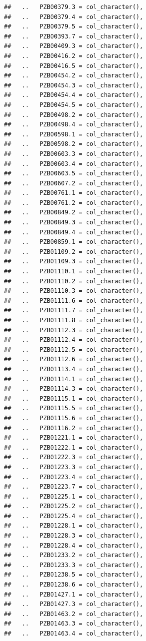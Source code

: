 \documentclass[
]{article}
\begin{document}
\begin{verbatim}
##   ..   PZB00379.3 = col_character(),
##   ..   PZB00379.4 = col_character(),
##   ..   PZB00379.5 = col_character(),
##   ..   PZB00393.7 = col_character(),
##   ..   PZB00409.3 = col_character(),
##   ..   PZB00416.2 = col_character(),
##   ..   PZB00416.5 = col_character(),
##   ..   PZB00454.2 = col_character(),
##   ..   PZB00454.3 = col_character(),
##   ..   PZB00454.4 = col_character(),
##   ..   PZB00454.5 = col_character(),
##   ..   PZB00498.2 = col_character(),
##   ..   PZB00498.4 = col_character(),
##   ..   PZB00598.1 = col_character(),
##   ..   PZB00598.2 = col_character(),
##   ..   PZB00603.3 = col_character(),
##   ..   PZB00603.4 = col_character(),
##   ..   PZB00603.5 = col_character(),
##   ..   PZB00607.2 = col_character(),
##   ..   PZB00761.1 = col_character(),
##   ..   PZB00761.2 = col_character(),
##   ..   PZB00849.2 = col_character(),
##   ..   PZB00849.3 = col_character(),
##   ..   PZB00849.4 = col_character(),
##   ..   PZB00859.1 = col_character(),
##   ..   PZB01109.2 = col_character(),
##   ..   PZB01109.3 = col_character(),
##   ..   PZB01110.1 = col_character(),
##   ..   PZB01110.2 = col_character(),
##   ..   PZB01110.3 = col_character(),
##   ..   PZB01111.6 = col_character(),
##   ..   PZB01111.7 = col_character(),
##   ..   PZB01111.8 = col_character(),
##   ..   PZB01112.3 = col_character(),
##   ..   PZB01112.4 = col_character(),
##   ..   PZB01112.5 = col_character(),
##   ..   PZB01112.6 = col_character(),
##   ..   PZB01113.4 = col_character(),
##   ..   PZB01114.1 = col_character(),
##   ..   PZB01114.3 = col_character(),
##   ..   PZB01115.1 = col_character(),
##   ..   PZB01115.5 = col_character(),
##   ..   PZB01115.6 = col_character(),
##   ..   PZB01116.2 = col_character(),
##   ..   PZB01221.1 = col_character(),
##   ..   PZB01222.1 = col_character(),
##   ..   PZB01222.3 = col_character(),
##   ..   PZB01223.3 = col_character(),
##   ..   PZB01223.4 = col_character(),
##   ..   PZB01223.7 = col_character(),
##   ..   PZB01225.1 = col_character(),
##   ..   PZB01225.2 = col_character(),
##   ..   PZB01225.4 = col_character(),
##   ..   PZB01228.1 = col_character(),
##   ..   PZB01228.3 = col_character(),
##   ..   PZB01228.4 = col_character(),
##   ..   PZB01233.2 = col_character(),
##   ..   PZB01233.3 = col_character(),
##   ..   PZB01238.5 = col_character(),
##   ..   PZB01238.6 = col_character(),
##   ..   PZB01427.1 = col_character(),
##   ..   PZB01427.3 = col_character(),
##   ..   PZB01463.2 = col_character(),
##   ..   PZB01463.3 = col_character(),
##   ..   PZB01463.4 = col_character(),

\end{verbatim}
\end{document}
